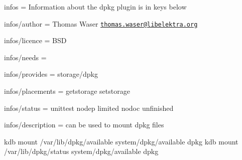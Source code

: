 
\begin{DoxyItemize}
\item infos = Information about the dpkg plugin is in keys below
\item infos/author = Thomas Waser \href{mailto:thomas.waser@libelektra.org}{\tt thomas.\+waser@libelektra.\+org}
\item infos/licence = B\+S\+D
\item infos/needs =
\item infos/provides = storage/dpkg
\item infos/placements = getstorage setstorage
\item infos/status = unittest nodep limited nodoc unfinished
\item infos/description = can be used to mount dpkg files
\end{DoxyItemize}

\begin{DoxyVerb}kdb mount /var/lib/dpkg/available system/dpkg/available dpkg
kdb mount /var/lib/dpkg/status system/dpkg/available dpkg\end{DoxyVerb}
 